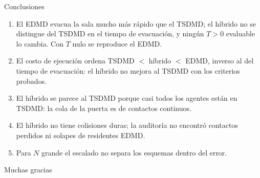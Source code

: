 
\begin{frame}{Conclusiones}
  \small
  \begin{enumerate}
    \item El EDMD evacua la sala mucho más rápido que el TSDMD; el híbrido no se distingue del
      TSDMD en el tiempo de evacuación, y ningún $T > 0$ evaluable lo cambia. Con $T$ nulo se reproduce
      el EDMD.
    \item El costo de ejecución ordena TSDMD $<$ híbrido $<$ EDMD, inverso al del tiempo de
      evacuación: el híbrido no mejora al TSDMD con los criterios probados.
    \item El híbrido se parece al TSDMD porque casi todos los agentes están en TSDMD: la cola de
      la puerta es de contactos continuos.
    \item El híbrido no tiene colisiones duras; la auditoría no encontró contactos perdidos ni
      solapes de residentes EDMD.
    \item Para $N$ grande el escalado no separa los esquemas dentro del error.
  \end{enumerate}
\end{frame}

\begin{frame}
  \vfill
  \centering
  {\Large Muchas gracias}
  \vfill
\end{frame}
